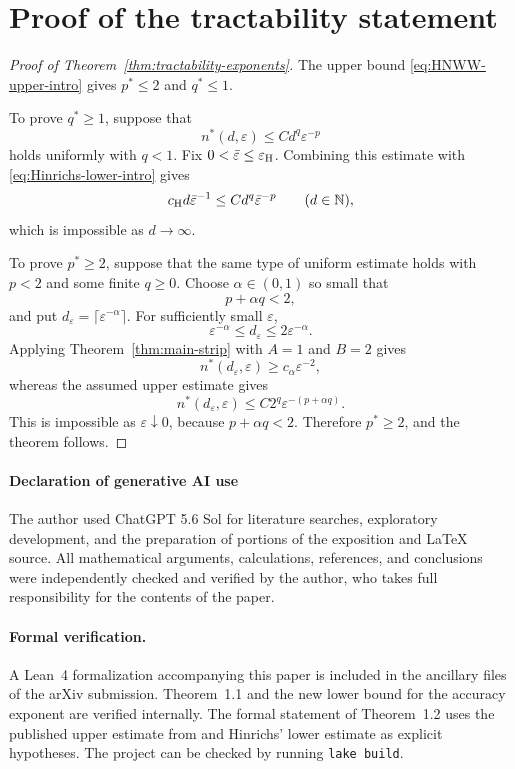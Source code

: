 \documentclass[11pt]{article}
\theoremstyle{plain}
\theoremstyle{remark}
\theoremstyle{definition}
\newcommand{\1}{\mathbf{1}}
\newcommand{\N}{\mathbb{N}}
\begin{document}
\section{Proof of the tractability statement}\label{sec:proof-tractability}

\begin{proof}[Proof of Theorem~\ref{thm:tractability-exponents}]
The upper bound \eqref{eq:HNWW-upper-intro} gives
\(p^\ast\le2\) and \(q^\ast\le1\).

To prove \(q^\ast\ge1\), suppose that
\[
 n^\ast(d,\varepsilon)\le C d^q\varepsilon^{-p}
\]
holds uniformly with \(q<1\).  Fix
\(0<\bar\varepsilon\le\varepsilon_{\rm H}\).  Combining this estimate
with \eqref{eq:Hinrichs-lower-intro} gives
\[
 c_{\rm H}d\bar\varepsilon^{-1}
 \le
 C d^q\bar\varepsilon^{-p}
 \qquad(d\in\N),
\]
which is impossible as \(d\to\infty\).

To prove \(p^\ast\ge2\), suppose that the same type of uniform estimate
holds with \(p<2\) and some finite \(q\ge0\).  Choose
\(\alpha\in(0,1)\) so small that
\[
 p+\alpha q<2,
\]
and put \(d_\varepsilon=\lceil\varepsilon^{-\alpha}\rceil\).  For
sufficiently small \(\varepsilon\),
\[
 \varepsilon^{-\alpha}
 \le d_\varepsilon\le2\varepsilon^{-\alpha}.
\]
Applying Theorem~\ref{thm:main-strip} with \(A=1\) and \(B=2\) gives
\[
 n^\ast(d_\varepsilon,\varepsilon)\ge c_\alpha\varepsilon^{-2},
\]
whereas the assumed upper estimate gives
\[
 n^\ast(d_\varepsilon,\varepsilon)
 \le C2^q\varepsilon^{-(p+\alpha q)}.
\]
This is impossible as \(\varepsilon\downarrow0\), because
\(p+\alpha q<2\).  Therefore \(p^\ast\ge2\), and the theorem follows.
\end{proof}





\paragraph{Declaration of generative AI use}

The author used ChatGPT 5.6 Sol for literature searches, exploratory
development, and the preparation of portions of the exposition and
LaTeX source. All mathematical arguments, calculations, references, and conclusions were independently checked and verified by the author, who takes full responsibility for the contents of the paper.

\paragraph{Formal verification.}
A Lean~4 formalization accompanying this paper is included in the
ancillary files of the arXiv submission. Theorem~1.1 and the new lower
bound for the accuracy exponent are verified internally. The formal
statement of Theorem~1.2 uses the published upper estimate from \cite{HNWW01} and
Hinrichs' lower estimate \cite{H04} as explicit hypotheses. The project can be
checked by running \texttt{lake build}.
\end{document}
